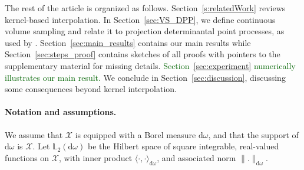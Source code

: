 \documentclass[twoside,11pt]{book}
\newcommand{\rev}[1]{\textcolor{darkgreen}{#1}}
\numberwithin{theorem}{chapter}
\numberwithin{definition}{chapter}
\numberwithin{proposition}{chapter}
\numberwithin{corollary}{chapter}
\numberwithin{example}{chapter}
\numberwithin{lemma}{chapter}
\begin{document}

The rest of the article is organized as follows. Section~\ref{s:relatedWork} reviews kernel-based interpolation. In Section~\ref{sec:VS_DPP}, we define continuous volume sampling and relate it to projection determinantal point processes, as used by \cite{BeBaCh19}. Section~\ref{sec:main_results} contains our main results while Section~\ref{sec:steps_proof} contains sketches of all proofs with pointers to the supplementary material for missing details. \rev{Section~\ref{sec:experiment} numerically illustrates our main result.} We conclude in Section~\ref{sec:discussion}, discussing some consequences beyond kernel interpolation.

\paragraph{Notation and assumptions.}\label{CVS_paragraph:notation}
We assume that $\mathcal{X}$ is equipped with a Borel measure $\mathrm{d}\omega$, and that the support of $\mathrm{d}\omega$ is $\mathcal{X}$.
 Let $\mathbb{L}_{2}(\mathrm{d}\omega)$ be the Hilbert space of square integrable, real-valued functions on $\mathcal{X}$, with inner product $\langle \cdot, \cdot \rangle_{\mathrm{d}\omega}$, and associated norm $\|.\|_{\mathrm{d}\omega}$.
%
\end{document}
